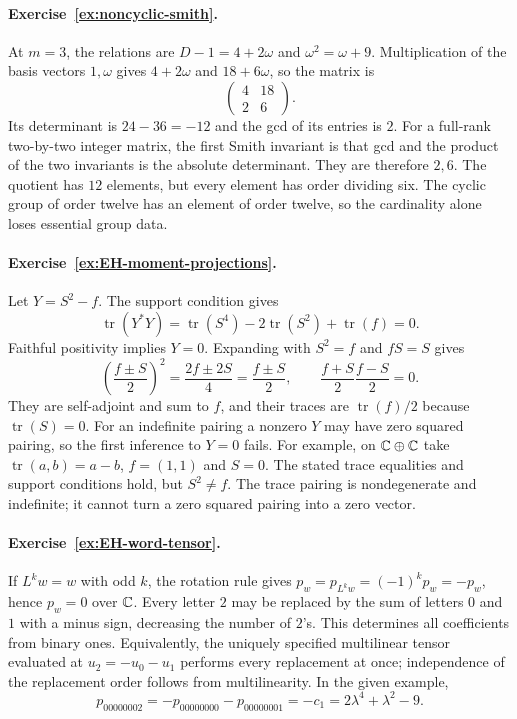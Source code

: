 \paragraph{Exercise~\ref{ex:noncyclic-smith}.}
\label{sol:ex:noncyclic-smith}
At $m=3$, the relations are $D-1=4+2\omega$ and
$\omega^2=\omega+9$. Multiplication of the basis vectors
$1,\omega$ gives $4+2\omega$ and $18+6\omega$,
so the matrix is
\[
 \begin{pmatrix}4&18\\2&6\end{pmatrix}.
\]
Its determinant is $24-36=-12$ and the gcd of its entries is
$2$. For a full-rank two-by-two integer matrix, the first Smith
invariant is that gcd and the product of the two invariants is
the absolute determinant. They are therefore $2,6$. The
quotient has $12$ elements, but every element has order dividing
six. The cyclic group of order twelve has an element of order
twelve, so the cardinality alone loses essential group data.



\paragraph{Exercise~\ref{ex:EH-moment-projections}.}
\label{sol:ex:EH-moment-projections}
Let $Y=S^2-f$. The support condition gives
\[
 \operatorname{tr}(Y^*Y)
 =\operatorname{tr}(S^4)-2\operatorname{tr}(S^2)
   +\operatorname{tr}(f)=0.
\]
Faithful positivity implies $Y=0$. Expanding with $S^2=f$
and $fS=S$ gives
\[
 \left(\frac{f\pm S}{2}\right)^2
 =\frac{2f\pm2S}{4}=\frac{f\pm S}{2},\qquad
 \frac{f+S}{2}\frac{f-S}{2}=0.
\]
They are self-adjoint and sum to $f$, and their traces are
$\operatorname{tr}(f)/2$ because $\operatorname{tr}(S)=0$.
For an indefinite pairing a nonzero $Y$ may have zero squared
pairing, so the first inference to $Y=0$ fails.
For example, on $\mathbb C\oplus\mathbb C$ take
$\operatorname{tr}(a,b)=a-b$, $f=(1,1)$ and $S=0$.
The stated trace equalities and support conditions hold, but
$S^2\ne f$. The trace pairing is nondegenerate and indefinite;
it cannot turn a zero squared pairing into a zero vector.



\paragraph{Exercise~\ref{ex:EH-word-tensor}.}
\label{sol:ex:EH-word-tensor}
If $L^kw=w$ with odd $k$, the rotation rule gives
$p_w=p_{L^kw}=(-1)^kp_w=-p_w$, hence $p_w=0$ over $\mathbb C$.
Every letter $2$ may be replaced by the sum of letters $0$ and
$1$ with a minus sign, decreasing the number of $2$'s. This
determines all coefficients from binary ones. Equivalently,
the uniquely specified multilinear tensor evaluated at
$u_2=-u_0-u_1$ performs every replacement at once; independence
of the replacement order follows from multilinearity. In the
given example,
\[
 p_{00000002}=-p_{00000000}-p_{00000001}
 =-c_1=2\lambda^4+\lambda^2-9.
\]



